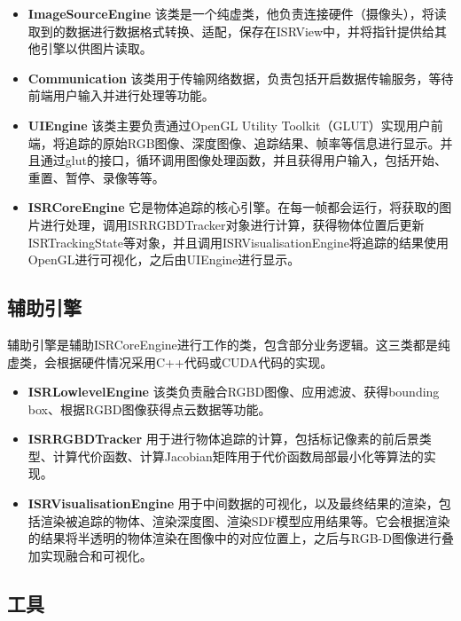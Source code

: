 \begin{itemize}
    \item \textbf{ImageSourceEngine}
该类是一个纯虚类，他负责连接硬件（摄像头），将读取到的数据进行数据格式转换、适配，保存在ISRView中，并将指针提供给其他引擎以供图片读取。
    
    \item \textbf{Communication}
该类用于传输网络数据，负责包括开启数据传输服务，等待前端用户输入并进行处理等功能。
    
    \item \textbf{UIEngine}
该类主要负责通过OpenGL Utility Toolkit（GLUT）实现用户前端，将追踪的原始RGB图像、深度图像、追踪结果、帧率等信息进行显示。并且通过glut的接口，循环调用图像处理函数，并且获得用户输入，包括开始、重置、暂停、录像等等。

    \item \textbf{ISRCoreEngine}
它是物体追踪的核心引擎。在每一帧都会运行，将获取的图片进行处理，调用ISRRGBDTracker对象进行计算，获得物体位置后更新ISRTrackingState等对象，并且调用ISRVisualisationEngine将追踪的结果使用OpenGL进行可视化，之后由UIEngine进行显示。

\end{itemize}

\subsection{辅助引擎}

辅助引擎是辅助ISRCoreEngine进行工作的类，包含部分业务逻辑。这三类都是纯虚类，会根据硬件情况采用C++代码或CUDA\cite{CUDARef}代码的实现。

\begin{itemize}
    \item \textbf{ISRLowlevelEngine}
该类负责融合RGBD图像、应用滤波、获得bounding box、根据RGBD图像获得点云数据等功能。
    
    \item \textbf{ISRRGBDTracker}
用于进行物体追踪的计算，包括标记像素的前后景类型、计算代价函数、计算Jacobian矩阵用于代价函数局部最小化等算法的实现。
    
    \item \textbf{ISRVisualisationEngine}
用于中间数据的可视化，以及最终结果的渲染，包括渲染被追踪的物体、渲染深度图、渲染SDF模型应用结果等。它会根据渲染的结果将半透明的物体渲染在图像中的对应位置上，之后与RGB-D图像进行叠加实现融合和可视化。

\end{itemize}

\subsection{工具}

